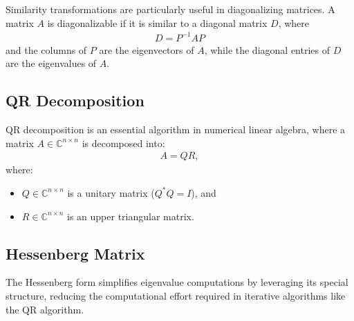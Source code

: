 \documentclass[12pt]{article}
\numberwithin{equation}{subsubsection}
\begin{document}
Similarity transformations are particularly useful in diagonalizing matrices. A matrix $A$ is diagonalizable if it is similar to a diagonal matrix $D$, where
\begin{align}
	D = P^{-1}AP
\end{align}
and the columns of $P$ are the eigenvectors of $A$, while the diagonal entries of $D$ are the eigenvalues of $A$.

\subsection{QR Decomposition}
QR decomposition is an essential algorithm in numerical linear algebra, where a matrix $ A \in \mathbb{C}^{n \times n} $ is decomposed into:
\begin{align}
	A = QR,
\end{align}
where:
\begin{itemize}
	\item $ Q \in \mathbb{C}^{n \times n} $ is a unitary matrix ($ Q^* Q = I $), and
	\item $ R \in \mathbb{C}^{n \times n} $ is an upper triangular matrix.
\end{itemize}

\subsection{Hessenberg Matrix}

The Hessenberg form simplifies eigenvalue computations by leveraging its special structure, reducing the computational effort required in iterative algorithms like the QR algorithm.
\end{document}
